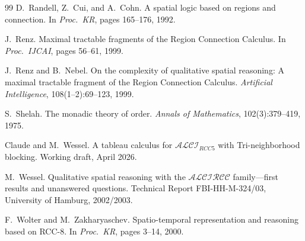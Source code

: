 \documentclass[a4paper,11pt]{article}
\theoremstyle{definition}
\begin{document}
\begin{thebibliography}{99}
D.~Randell, Z.~Cui, and A.~Cohn.
\newblock A spatial logic based on regions and connection.
\newblock In \emph{Proc.\ KR}, pages 165--176, 1992.

J.~Renz.
\newblock Maximal tractable fragments of the Region Connection
  Calculus.
\newblock In \emph{Proc.\ IJCAI}, pages 56--61, 1999.

J.~Renz and B.~Nebel.
\newblock On the complexity of qualitative spatial reasoning: A
  maximal tractable fragment of the Region Connection Calculus.
\newblock \emph{Artificial Intelligence}, 108(1--2):69--123, 1999.

S.~Shelah.
\newblock The monadic theory of order.
\newblock \emph{Annals of Mathematics}, 102(3):379--419, 1975.

Claude and M.~Wessel.
\newblock A tableau calculus for $\mathcal{ALCI}_{RCC5}$ with
  Tri-neighborhood blocking.
\newblock Working draft, April 2026.

M.~Wessel.
\newblock Qualitative spatial reasoning with the $\mathcal{ALCIRCC}$
  family---first results and unanswered questions.
\newblock Technical Report FBI-HH-M-324/03, University of Hamburg,
  2002/2003.

F.~Wolter and M.~Zakharyaschev.
\newblock Spatio-temporal representation and reasoning based on RCC-8.
\newblock In \emph{Proc.\ KR}, pages 3--14, 2000.

\end{thebibliography}
\end{document}
